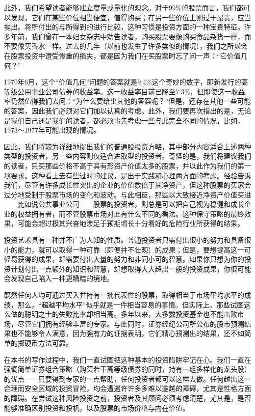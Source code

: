 \documentclass[12pt,oneside]{book}
\begin{document}
此外，我们希望读者能够建立度量或量化的观念。对于99\%的股票而言，我们都可以发现，它们在某些价位相当便宜，值得购买；在另一些价位上则过于昂贵，应当抛出。将所付出的与所得到的进行比较，这种习惯是投资方面的一种宝贵特征。许多年前，我们曾在一本妇女杂志中劝告读者，购买股票要像购买食品杂货一样，而不要像买香水一样。过去的几年（以前也发生了许多类似的情况），我们之所以会在股票投资中遭受惨重的损失，都是因为我们在买股票时忘了问一声：“它价值几何？”

1970年6月，这个“价值几何”问题的答案就是9.4\%这个奇妙的数字，即新发行的高等级公用事业公司债券的收益率。这一收益率目前已降至7.3\%，但即使这一收益率仍然值得我们去问：“为什么要给出其他的答案呢？”但是，还存在其他一些可能的答案，因此我们必须对它们加以认真的考虑。此外，我们要再次指出的是，无论是我们自己还是我们的读者，都必须事先考虑一些与此完全不同的情况，比如，1973～1977年可能出现的情况。

因此，我们将较为详细地提出我们的普通股投资方略，其中部分内容适合上述两种类型的投资者，另一些内容则仅适合进取型的投资者。奇怪的是，我们将建议我们的读者，只买那些价格不高于其有形资产价值太多的股票，并以此作为我们的第一项要求。这种看上去有些过时的建议，是出于实践和心理两方面的考虑。经验告诉我们，尽管有许多成长性突出的企业的价值数倍于其净资产，但这种股票的买家会过分地受制于股票市场的变化和波动。与此相反，那些以大致接近净资产价值买进——比如说公共事业公司——股票的投资者，则总是可以把自己视为稳健和成长企业的权益拥有者，而不管股票市场对此有什么不同的看法。这种保守策略的最终效果，可能会超过极其兴奋地涉足于预期增长十分看好的危险行业所获得的结果。

投资艺术具有一种并不广为人知的性质。普通投资者只需付出很小的努力和具备很小的能力，就可以取得一种可靠（即便并不壮观）的成果；但是，要想提高这一可轻易获得的成果，却需要付出大量的努力和非同小可的智慧。如果你只想为你的投资计划付出一点额外的知识和智慧，却想取得大大超出一般的投资成果，你很可能会发现自己陷入一种更糟糕的境地。

既然任何人均可通过买入并持有一批代表性的股票，取得相当于市场平均水平的成绩，那么，“超越平均水平”似乎就是一件相当容易的事情。但实际上，那些试图这么做的聪明之士的失败比率却相当高。多年以来，大多数投资基金也不能击败市场，尽管它们拥有经验丰富的专家。与此同时，证券经纪公司所公布的股市预测结果也不能够令人满意，因为强有力的证据表明，它们精心预测出的结果，还不如简单的掷硬币方法可靠。

在本书的写作过程中，我们一直试图把这种基本的投资陷阱牢记在心。我们一直在强调简单证券组合策略（购买若干高等级债券的同时，持有一组多样化的龙头股）的优点——只要得到专家的一点帮助，任何投资者都可以这样去做。任何越出这一合理而安全区域的投资冒险，均会遭遇许许多多难以逾越的障碍，尤其是性格方面的障碍。在尝试这种风险投资之前，投资者及其顾问必须考虑清楚，尤其是，是否能够准确区别投资和投机，以及股票的市场价格与内在价值。
\end{document}
